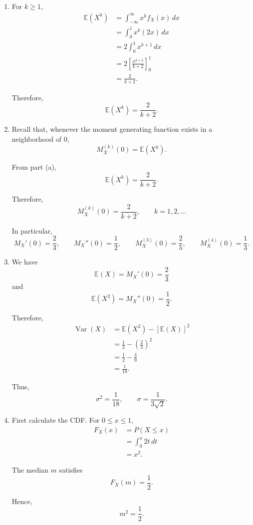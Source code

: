 \documentclass[11pt]{article}
\newenvironment{solution}{
    \par
    \begin{tcolorbox}[
        colback=white,
        colframe=uwgold,
        boxrule=0.7pt,
        arc=2mm,
        left=3mm,
        right=3mm,
        top=2mm,
        bottom=2mm,
        breakable,
        before skip=0.5em,
        after skip=1em,
        title=\textbf{Solution},
        coltitle=uwpurple,
        fonttitle=\bfseries
    ]
}{
    \end{tcolorbox}
}
\newcommand{\E}{\mathbb{E}}
\begin{document}
\begin{solution}

\begin{enumerate}[label=(\alph*)]

\item For \(k\geq1\),
\[
\begin{aligned}
\E(X^k)
&=
\int_{-\infty}^{\infty}x^k f_X(x)\,dx\\
&=
\int_0^1 x^k(2x)\,dx\\
&=
2\int_0^1 x^{k+1}\,dx\\
&=
2\left[\frac{x^{k+2}}{k+2}\right]_0^1\\
&=
\frac{2}{k+2}.
\end{aligned}
\]

Therefore,
\[
\E(X^k)=\frac{2}{k+2}.
\]


\item Recall that, whenever the moment generating function exists in a
neighborhood of \(0\),
\[
M_X^{(k)}(0)=\E(X^k).
\]

From part (a),
\[
\E(X^k)=\frac{2}{k+2}.
\]

Therefore,
\[
M_X^{(k)}(0)
=
\frac{2}{k+2},
\qquad k=1,2,\ldots
\]

In particular,
\[
M_X'(0)=\frac23,
\qquad
M_X''(0)=\frac12,
\qquad
M_X^{(3)}(0)=\frac25,
\qquad
M_X^{(4)}(0)=\frac13.
\]


\item We have
\[
\E(X)=M_X'(0)=\frac23
\]
and
\[
\E(X^2)=M_X''(0)=\frac12.
\]

Therefore,
\[
\begin{aligned}
\operatorname{Var}(X)
&=
\E(X^2)-[\E(X)]^2\\
&=
\frac12-\left(\frac23\right)^2\\
&=
\frac12-\frac49\\
&=
\frac1{18}.
\end{aligned}
\]

Thus,
\[
\sigma^2=\frac1{18},
\qquad
\sigma=\frac{1}{3\sqrt2}.
\]


\item First calculate the CDF. For \(0\leq x\leq1\),
\[
\begin{aligned}
F_X(x)
&=
P(X\leq x)\\
&=
\int_0^x 2t\,dt\\
&=
x^2.
\end{aligned}
\]

The median \(m\) satisfies
\[
F_X(m)=\frac12.
\]

Hence,
\[
m^2=\frac12.
\]


\end{enumerate}
\end{solution}
\end{document}
